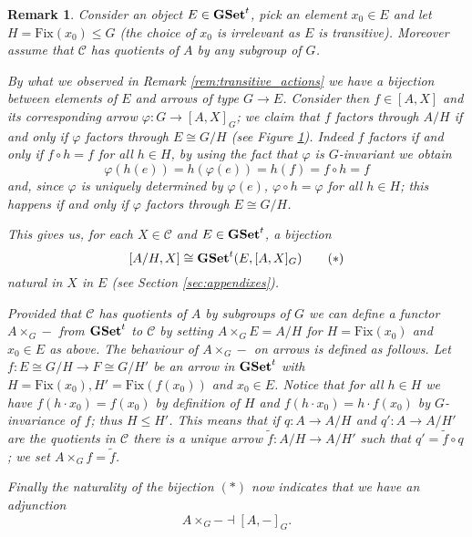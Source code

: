\documentclass[italian, 12pt, reqno]{article}
\theoremstyle{myteo}
\newtheorem{remark}[theorem]{Remark}
\numberwithin{equation}{section}
\newcommand{\cat}[1]{\mathscr{#1}}
\newcommand{\tgset}{\text{\textbf{GSet}}^t}
\newcommand{\fix}[1]{\text{Fix}(#1)}
\newcommand{\homs}[2]{[#1, #2]}
\newcommand{\fun}[3]{#1\colon#2\to #3}
\begin{document}
\begin{remark}
  \label{rem:adjoints}
  Consider an object \(E\in\tgset\), pick an element \(x_0\in E\) and let \(H = \fix{x_0}\leq G\) (the choice of \(x_0\) is irrelevant as \(E\) is transitive).
  Moreover assume that \(\cat{C}\) has quotients of \(A\) by any subgroup of \(G\).

  By what we observed in Remark \ref{rem:transitive_actions} we have a bijection between elements of \(E\) and arrows of type \(G\to E\).
  Consider then \(f\in\homs{A}{X}\) and its corresponding arrow \(\fun{\varphi}{G}{\homs{A}{X}_G}\); we claim that \(f\) factors through \(A/H\) if and only if \(\varphi\) factors through \(E \cong G/H\) (see Figure \ref{diagram:bijection}).
  Indeed \(f\) factors if and only if \(f\circ h = f\) for all \(h\in H\), by using the fact that \(\varphi\) is \(G\)-invariant we obtain
  \[\varphi(h(e)) = h(\varphi(e)) = h(f) = f\circ h = f\]
  and, since \(\varphi\) is uniquely determined by \(\varphi(e)\),  \(\varphi\circ h =\varphi\) for all \(h\in H\); this happens if and only if \(\varphi\) factors through \(E\cong G/H\).

  This gives us, for each \(X\in\cat{C}\) and \(E\in\tgset\), a bijection
  \[[A/H, X] \cong \tgset(E, [A, X]_G)\tag{\(*\)}\]
  natural in \(X\) in \(E\) (see Section \ref{sec:appendixes}).

	Provided that \(\cat{C}\) has quotients of \(A\) by subgroups of \(G\) we can define a functor \(A\times_G -\) from \(\tgset\) to \(\cat{C}\) by setting \(A\times_G E = A/H\) for \(H=\text{Fix}(x_0)\) and \(x_0\in E\) as above.
	The behaviour of \(A\times_G-\) on arrows is defined as follows.
	Let \(\fun{f}{E\cong G/H}{F\cong G/H'}\) be an arrow in \(\tgset\) with \(H=\text{Fix}(x_0), H'=\text{Fix}(f(x_0))\) and \(x_0\in E\).
	Notice that for all \(h\in H\) we have \(f(h\cdot x_0) = f(x_0)\) by definition of \(H\) and \(f(h\cdot x_0) = h\cdot f(x_0)\) by \(G\)-invariance of \(f\); thus \(H\leq H'\).
	This means that if \(\fun{q}{A}{A/H}\) and \(\fun{q'}{A}{A/H'}\) are the quotients in \(\cat{C}\) there is a unique arrow \(\fun{\tilde{f}}{A/H}{A/H'}\) such that \(q' = \tilde{f}\circ q\); we set \(A\times_G f = \tilde{f}\).
	
	Finally the naturality of the bijection \((*)\) now indicates that we have an adjunction
  \[A\times_G - \dashv \homs{A}{-}_G.\] 
\end{remark}

\begin{figure}[h]
  \begin{center}
    \hspace{2cm}
  \end{center}
  \caption{}
  \label{diagram:bijection}
\end{figure}
\end{document}
